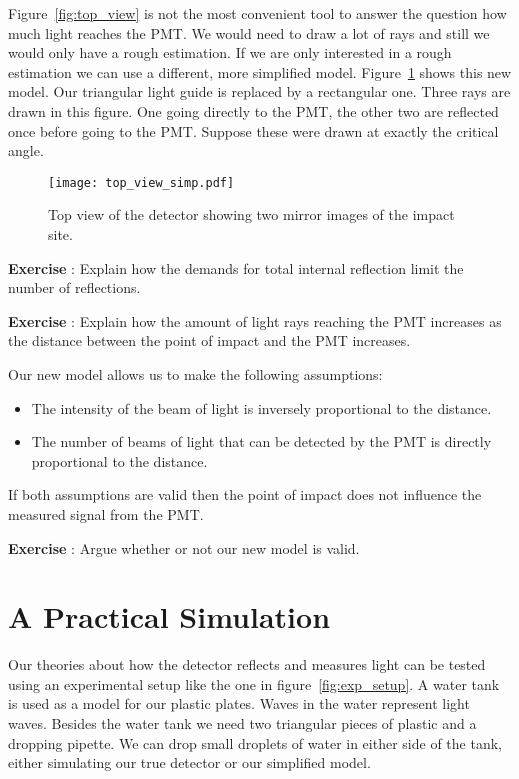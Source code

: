 Figure~\ref{fig:top_view} is not the most convenient tool to answer the question how much light reaches the PMT. We would need to draw a lot of rays and still we would only have a rough estimation. If we are only interested in a rough estimation we can use a different, more simplified model. Figure~\ref{fig:top_view_simp} shows this new model. Our triangular light guide is replaced by a rectangular one. Three rays are drawn in this figure. One going directly to the PMT, the other two are reflected once before going to the PMT. Suppose these were drawn at exactly the critical angle.

\begin{figure}\begin{center}
\texttt{[image: top\_view\_simp.pdf]}
\caption{Top view of the detector showing two mirror images of the impact site.}\label{fig:top_view_simp}
\end{center}\end{figure}

\begin{shaded}
\textbf{Exercise \theExercise {}} : Explain how the demands for total internal reflection limit the number of reflections.\end{shaded}
\begin{shaded}
\textbf{Exercise \theExercise {}} : Explain how the amount of light rays reaching the PMT increases as the distance between the point of impact and the PMT increases.\end{shaded}

Our new model allows us to make the following assumptions:
\begin{itemize}
\item The intensity of the beam of light is inversely proportional to the distance.
\item The number of beams of light that can be detected by the PMT is directly proportional to the distance.
\end{itemize}
If both assumptions are valid then the point of impact does not influence the measured signal from the PMT.

\begin{shaded}
\textbf{Exercise \theExercise {}} : Argue whether or not our new model is valid.\end{shaded}

\section{A Practical Simulation}
Our theories about how the detector reflects and measures light can be tested using an experimental setup like the one in figure~\ref{fig:exp_setup}. A water tank is used as a model for our plastic plates. Waves in the water represent light waves. Besides the water tank we need two triangular pieces of plastic and a dropping pipette. We can drop small droplets of water in either side of the tank, either simulating our true detector or our simplified model.

